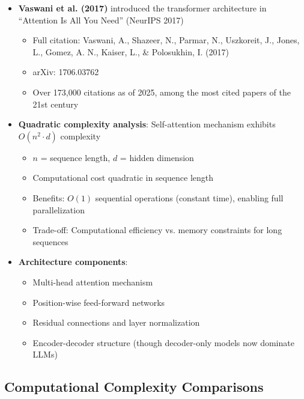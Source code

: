 \documentclass[11pt,letterpaper]{article}
\begin{document}
\begin{itemize}[leftmargin=*]
    \item \textbf{Vaswani et al. (2017)} introduced the transformer architecture in ``Attention Is All You Need'' (NeurIPS 2017)
    \begin{itemize}
        \item Full citation: Vaswani, A., Shazeer, N., Parmar, N., Uszkoreit, J., Jones, L., Gomez, A. N., Kaiser, L., \& Polosukhin, I. (2017)
        \item arXiv: 1706.03762
        \item Over 173,000 citations as of 2025, among the most cited papers of the 21st century
    \end{itemize}

    \item \textbf{Quadratic complexity analysis}: Self-attention mechanism exhibits $O(n^2 \cdot d)$ complexity
    \begin{itemize}
        \item $n$ = sequence length, $d$ = hidden dimension
        \item Computational cost quadratic in sequence length
        \item Benefits: $O(1)$ sequential operations (constant time), enabling full parallelization
        \item Trade-off: Computational efficiency vs. memory constraints for long sequences
    \end{itemize}

    \item \textbf{Architecture components}:
    \begin{itemize}
        \item Multi-head attention mechanism
        \item Position-wise feed-forward networks
        \item Residual connections and layer normalization
        \item Encoder-decoder structure (though decoder-only models now dominate LLMs)
    \end{itemize}
\end{itemize}

\subsection{Computational Complexity Comparisons}
\end{document}
